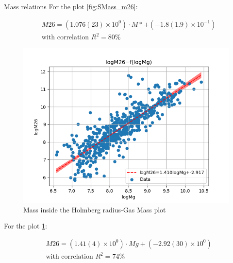 \documentclass[presentation]{beamer}
\begin{document}
\begin{frame}[label={sec:orgfa6d8ce}]{Mass relations}
For the plot \ref{fig:SMass_m26}:


\begin{equation}\label{eq:logStellarMass-logM26}
\begin{align}
& M26 = (1.076(23) \times 10^{0})\cdot M* + (-1.8(1.9) \times 10^{-1}) \\
& \textrm{with correlation } R^2=80\%
\end{align}
\end{equation}
\noindent


\begin{figure}[!htpb]
\centering
\includegraphics[width=.9\linewidth]{./figs/logMg-logM26.png}
\caption{\label{fig:mg_m26}Mass inside the Holmberg radius-Gas Mass plot}
\end{figure}

For the plot \ref{fig:mg_m26}:


\begin{equation}\label{eq:logMg-logM26}
\begin{align}
& M26 = (1.41(4) \times 10^{0})\cdot Mg + (-2.92(30) \times 10^{0}) \\
& \textrm{with correlation } R^2=74\%
\end{align}
\end{equation}
\noindent



\end{frame}
\end{document}
